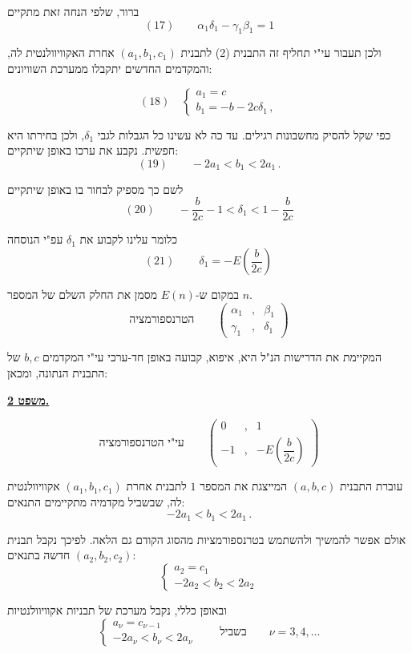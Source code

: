 \noindent ברור, שלפי הנחה זאת מתקיים
\[ (17) \qquad \alpha_1 \delta_1 - \gamma_1 \beta_1 = 1 \]

\noindent ולכן תעבור עי"י תחליף זה התבנית (2) לתבנית $(a_1, b_1, c_1)$
אחרת האקוויוולנטית לה, והמקדמים החדשים יתקבלו ממערכת השוויונים:

\[ (18) \quad \left\{ \begin{array}{l}
a_1 = c \\
b_1 = -b - 2c\delta_1 \, ,
\end{array} \right. \]

\noindent כפי שקל להסיק מחשבונות רגילים. עד כה לא עשינו כל הגבלות לגבי
$\delta_1$, ולכן בחירתו היא חפשית. נקבע את ערכו באופן שיתקיים:
\[ (19) \qquad -2a_1 < b_1 < 2a_1 \, . \]

\noindent לשם כך מספיק לבחור בו באופן שיתקיים
\[ (20) \qquad -\frac{b}{2c} - 1 < \delta_1 < 1 - \frac{b}{2c} \]

\noindent כלומר עלינו לקבוע את $\delta_1$ עפ"י הנוסחה
\[ (21) \qquad \boxed{\, \delta_1 = -E\!\left(\dfrac{b}{2c}\right) \,} \]

\noindent במקום ש-$E(n)$ מסמן את החלק השלם של המספר $n$.
\[ \text{הטרנספורמציה} \qquad \begin{pmatrix} \alpha_1 & , & \beta_1 \\ \gamma_1 & , & \delta_1 \end{pmatrix} \]

\noindent המקיימת את הדרישות הנ"ל היא, איפוא, קבועה באופן חד-ערכי עי"י
המקדמים $b, c$ של התבנית הנתונה, ומכאן:

\bigskip
\noindent\textbf{\underline{משפט 2.}}

\[ \text{עי"י הטרנספורמציה} \qquad \begin{pmatrix} 0 & , & 1 \\ -1 & , & -E\!\left(\dfrac{b}{2c}\right) \end{pmatrix} \]

\noindent עוברת התבנית $(a,b,c)$ המייצגת את המספר $1$ לתבנית אחרת
$(a_1, b_1, c_1)$ אקוויוולנטית לה, שבשביל מקדמיה מתקיימים התנאים:
\[ -2a_1 < b_1 < 2a_1 \, . \]

\noindent אולם אפשר להמשיך ולהשתמש בטרנספורמציות מהסוג הקודם גם הלאה.
לפיכך נקבל תבנית $(a_2, b_2, c_2)$ חדשה בתנאים:
\[ \left\{ \begin{array}{l}
a_2 = c_1 \\
-2a_2 < b_2 < 2a_2
\end{array} \right. \]

\noindent ובאופן כללי, נקבל מערכת של תבניות אקוויוולנטיות
\[ \left\{ \begin{array}{l}
a_\nu = c_{\nu-1} \\
-2a_\nu < b_\nu < 2a_\nu
\end{array} \right. \qquad \text{בשביל} \qquad \nu = 3, 4, \ldots \]

